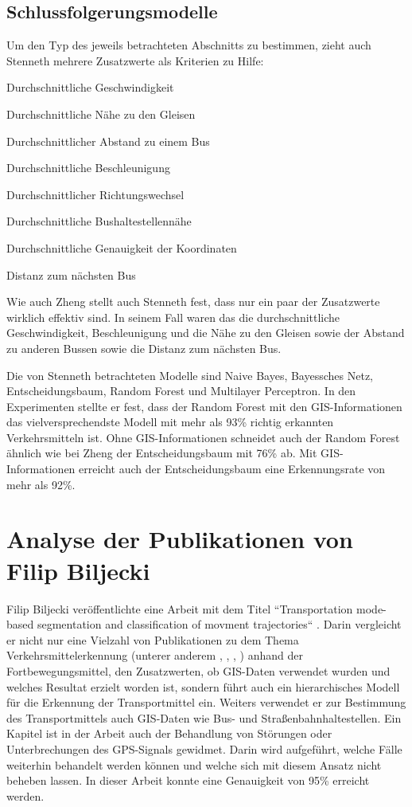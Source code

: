 \subsection{Schlussfolgerungsmodelle}
Um den Typ des jeweils betrachteten Abschnitts zu bestimmen, zieht auch Stenneth mehrere Zusatzwerte als Kriterien zu Hilfe:

\begin{pitemize}
\item Durchschnittliche Geschwindigkeit
\item Durchschnittliche Nähe zu den Gleisen
\item Durchschnittlicher Abstand zu einem Bus
\item Durchschnittliche Beschleunigung
\item Durchschnittlicher Richtungswechsel
\item Durchschnittliche Bushaltestellennähe
\item Durchschnittliche Genauigkeit der Koordinaten
\item Distanz zum nächsten Bus
\end{pitemize}

Wie auch Zheng stellt auch Stenneth fest, dass nur ein paar der Zusatzwerte wirklich effektiv sind. In seinem Fall waren das die durchschnittliche Geschwindigkeit, Beschleunigung und die Nähe zu den Gleisen sowie der Abstand zu anderen Bussen sowie die Distanz zum nächsten Bus.

Die von Stenneth betrachteten Modelle sind Naive Bayes, Bayessches Netz, Entscheidungsbaum, Random Forest und Multilayer Perceptron. In den Experimenten stellte er fest, dass der Random Forest mit den GIS-Informationen das vielversprechendste Modell mit mehr als 93\% richtig erkannten Verkehrsmitteln ist. Ohne GIS-Informationen schneidet auch der Random Forest ähnlich wie bei Zheng der Entscheidungsbaum mit 76\% ab. Mit GIS-Informationen erreicht auch der Entscheidungsbaum eine Erkennungsrate von mehr als 92\%. 

\section{Analyse der Publikationen von Filip Biljecki}
Filip Biljecki veröffentlichte eine Arbeit mit dem Titel ``Transportation mode-based segmentation and classification of movment trajectories`` \cite{biljecki_transportation_2013}. Darin vergleicht er nicht nur eine Vielzahl von Publikationen zu dem Thema Verkehrsmittelerkennung (unterer anderem \cite{schuessler_processing_2009}, \cite{zheng_understanding_2010}, \cite{reddy_using_2010}, \cite{gonzalez_automating_2010}) anhand der Fortbewegungsmittel, den Zusatzwerten, ob GIS-Daten verwendet wurden und welches Resultat erzielt worden ist, sondern führt auch ein hierarchisches Modell für die Erkennung der Transportmittel ein. Weiters verwendet er zur Bestimmung des Transportmittels auch GIS-Daten wie Bus- und Straßenbahnhaltestellen. Ein Kapitel ist in der Arbeit auch der Behandlung von Störungen oder Unterbrechungen des GPS-Signals gewidmet. Darin wird aufgeführt, welche Fälle weiterhin behandelt werden können und welche sich mit diesem Ansatz nicht beheben lassen. In dieser Arbeit konnte eine Genauigkeit von 95\% erreicht werden.

